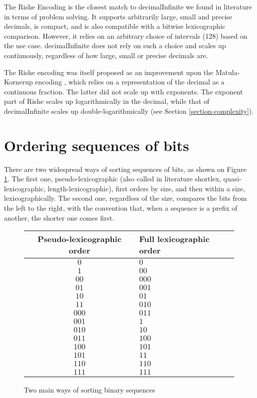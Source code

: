 \documentclass{acm_proc_article-sp}
\begin{document}
The Rishe Encoding \cite{Rishe1992} is the closest match to decimalInfinite we found in literature in terms of problem solving. It supports arbitrarily large, small and precise decimals, is compact, and is also compatible with a bitwise lexicographic comparison. However, it relies on an arbitrary choice of intervals (128) based on the use case. decimalInfinite does not rely on such a choice and scales up continuously, regardless of how large, small or precise decimals are.

The Rishe encoding was itself proposed as an improvement upon the Matula-Kornerup encoding \cite{Kornerup1983}, which relies on a representation of the decimal as a continuous fraction. The latter did not scale up with exponents. The exponent part of Rishe scales up logarithmically in the decimal, while that of decimalInfinite scales up double-logarithmically (see Section \ref{section-complexity}).

\section{Ordering sequences of bits}
\label{section-ordering}

There are two widespread ways of sorting sequences of bits, as shown on Figure \ref{figure-orders}. The first one, pseudo-lexicographic (also called in literature shortlex, quasi-lexicographic, length-lexicographic), first orders by size, and then within a size, lexicographically. The second one, regardless of the size, compares the bits from the left to the right, with the convention that, when a sequence is a prefix of another, the shorter one comes first.

\begin{figure}[p]
\caption{Two main ways of sorting binary sequences}
\label{figure-orders}
\center
\begin{tabular}{|c|l|}
\hline
Pseudo-lexicographic order & Full lexicographic order\\
\hline
$0$ & $0$ \\
$1$ & $00$ \\
$00$ & $000$ \\
$01$ & $001$ \\
$10$ & $01$ \\
$11$ & $010$ \\
$000$ & $011$ \\
$001$ & $1$ \\
$010$ & $10$ \\
$011$ & $100$ \\
$100$ & $101$ \\
$101$ & $11$ \\
$110$ & $110$ \\
$111$ & $111$ \\
\hline
\end{tabular}
\end{figure}
\end{document}

